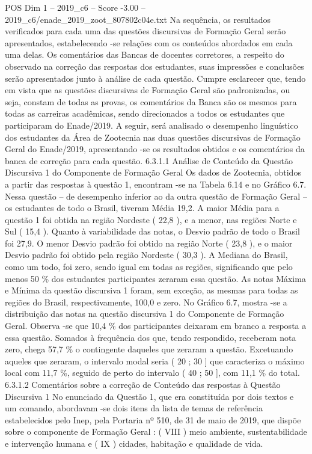 \begin{textsample}{POS Dim 1 – 2019\_c6 – Score -3.00 – 2019\_c6/enade\_2019\_zoot\_807802c04e.txt}
Na sequência, os resultados verificados para cada uma das questões discursivas de Formação Geral serão apresentados, estabelecendo -se relações com os conteúdos abordados em cada uma delas.
Os comentários das Bancas de docentes corretores, a respeito do observado na correção das respostas dos estudantes, suas impressões e conclusões serão apresentados junto à análise de cada questão.
Cumpre esclarecer que, tendo em vista que as questões discursivas de Formação Geral são padronizadas, ou seja, constam de todas as provas, os comentários da Banca são os mesmos para todas as carreiras acadêmicas, sendo direcionados a todos os estudantes que participaram do Enade/2019.
A seguir, será analisado o desempenho linguístico dos estudantes da Área de Zootecnia nas duas questões discursivas de Formação Geral do Enade/2019, apresentando -se os resultados obtidos e os comentários da banca de correção para cada questão. 6.3.1.1 Análise de Conteúdo da Questão Discursiva 1 do Componente de Formação Geral Os dados de Zootecnia, obtidos a partir das respostas à questão 1, encontram -se na Tabela 6.14 e no Gráfico 6.7.
Nessa questão – de desempenho inferior ao da outra questão de Formação Geral – os estudantes de todo o Brasil, tiveram Média 19,2.
A maior Média para a questão 1 foi obtida na região Nordeste ( 22,8 ), e a menor, nas regiões Norte e Sul ( 15,4 ).
Quanto à variabilidade das notas, o Desvio padrão de todo o Brasil foi 27,9.
O menor Desvio padrão foi obtido na região Norte ( 23,8 ), e o maior Desvio padrão foi obtido pela região Nordeste ( 30,3 ).
A Mediana do Brasil, como um todo, foi zero, sendo igual em todas as regiões, significando que pelo menos 50 \% dos estudantes participantes zeraram essa questão.
As notas Máxima e Mínima da questão discursiva 1 foram, sem exceção, as mesmas para todas as regiões do Brasil, respectivamente, 100,0 e zero.
No Gráfico 6.7, mostra -se a distribuição das notas na questão discursiva 1 do Componente de Formação Geral.
Observa -se que 10,4 \% dos participantes deixaram em branco a resposta a essa questão.
Somados à frequência dos que, tendo respondido, receberam nota zero, chega 57,7 \% o contingente daqueles que zeraram a questão.
Excetuando aqueles que zeraram, o intervalo modal seria ( 20 ; 30 ] que caracteriza o máximo local com 11,7 \%, seguido de perto do intervalo ( 40 ; 50 ], com 11,1 \% do total. 6.3.1.2 Comentários sobre a correção de Conteúdo das respostas à Questão Discursiva 1 No enunciado da Questão 1, que era constituída por dois textos e um comando, abordavam -se dois itens da lista de temas de referência estabelecidos pelo Inep, pela Portaria nº 510, de 31 de maio de 2019, que dispõe sobre o componente de Formação Geral : ( VIII ) meio ambiente, sustentabilidade e intervenção humana e ( IX ) cidades, habitação e qualidade de vida.

\end{textsample}
